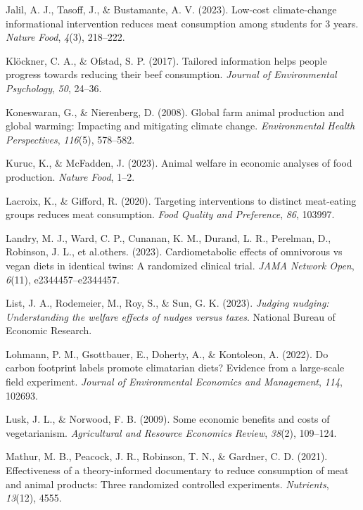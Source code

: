 \documentclass[
  man]{apa6}
\newlength{\cslhangindent}
\newenvironment{CSLReferences}[2] %
 {\begin{list}{}{%
  \setlength{\itemindent}{0pt}
  \setlength{\leftmargin}{0pt}
  \setlength{\parsep}{0pt}
  \ifodd #1
   \setlength{\leftmargin}{\cslhangindent}
   \setlength{\itemindent}{-1\cslhangindent}
  \fi
  \setlength{\itemsep}{#2\baselineskip}}}
 {\end{list}}
\begin{document}
\begin{CSLReferences}{1}{0}
Jalil, A. J., Tasoff, J., \& Bustamante, A. V. (2023). Low-cost climate-change informational intervention reduces meat consumption among students for 3 years. \emph{Nature Food}, \emph{4}(3), 218--222.

Klöckner, C. A., \& Ofstad, S. P. (2017). Tailored information helps people progress towards reducing their beef consumption. \emph{Journal of Environmental Psychology}, \emph{50}, 24--36.

Koneswaran, G., \& Nierenberg, D. (2008). Global farm animal production and global warming: Impacting and mitigating climate change. \emph{Environmental Health Perspectives}, \emph{116}(5), 578--582.

Kuruc, K., \& McFadden, J. (2023). Animal welfare in economic analyses of food production. \emph{Nature Food}, 1--2.

Lacroix, K., \& Gifford, R. (2020). Targeting interventions to distinct meat-eating groups reduces meat consumption. \emph{Food Quality and Preference}, \emph{86}, 103997.

Landry, M. J., Ward, C. P., Cunanan, K. M., Durand, L. R., Perelman, D., Robinson, J. L., et al.others. (2023). Cardiometabolic effects of omnivorous vs vegan diets in identical twins: A randomized clinical trial. \emph{JAMA Network Open}, \emph{6}(11), e2344457--e2344457.

List, J. A., Rodemeier, M., Roy, S., \& Sun, G. K. (2023). \emph{Judging nudging: Understanding the welfare effects of nudges versus taxes}. National Bureau of Economic Research.

Lohmann, P. M., Gsottbauer, E., Doherty, A., \& Kontoleon, A. (2022). Do carbon footprint labels promote climatarian diets? Evidence from a large-scale field experiment. \emph{Journal of Environmental Economics and Management}, \emph{114}, 102693.

Lusk, J. L., \& Norwood, F. B. (2009). Some economic benefits and costs of vegetarianism. \emph{Agricultural and Resource Economics Review}, \emph{38}(2), 109--124.

Mathur, M. B., Peacock, J. R., Robinson, T. N., \& Gardner, C. D. (2021). Effectiveness of a theory-informed documentary to reduce consumption of meat and animal products: Three randomized controlled experiments. \emph{Nutrients}, \emph{13}(12), 4555.


\end{CSLReferences}
\end{document}
